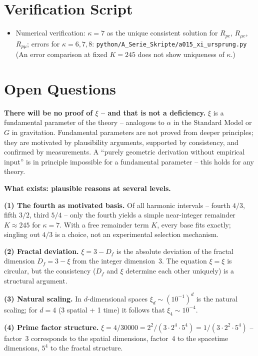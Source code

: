 \section{Verification Script}

\begin{itemize}[leftmargin=2em,itemsep=2pt,topsep=2pt]
  \item Numerical verification: $\kappa=7$ as the unique consistent solution
    for $R_{pe}$, $R_{\mu e}$, $R_{p\mu}$; errors for $\kappa=6,7,8$:
    \texttt{python/A\_Serie\_Skripte/a015\_xi\_ursprung.py}
    (An error comparison at fixed $K=245$ does not show uniqueness of $\kappa$.)
\end{itemize}

\section{Open Questions}

\textbf{There will be no proof of $\xi$ -- and that is not a deficiency.}
$\xi$ is a fundamental parameter of the theory -- analogous to $\alpha$ in
the Standard Model or $G$ in gravitation. Fundamental parameters are not
proved from deeper principles; they are motivated by plausibility arguments,
supported by consistency, and confirmed by measurements. A ``purely geometric
derivation without empirical input'' is in principle impossible for a
fundamental parameter -- this holds for any theory.

\textbf{What exists: plausible reasons at several levels.}

\textbf{(1) The fourth as motivated basis.} Of all harmonic
intervals -- fourth $4/3$, fifth $3/2$, third $5/4$ -- only the fourth
yields a simple near-integer remainder $K \approx 245$ for $\kappa=7$.
With a free remainder term $K$, every base fits exactly; singling out $4/3$
is a choice, not an experimental selection mechanism.

\textbf{(2) Fractal deviation.} $\xi=3-D_f$ is the absolute deviation
of the fractal dimension $D_f=3-\xi$ from the integer dimension~3.
The equation $\xi=\xi$ is circular, but the consistency ($D_f$ and $\xi$
determine each other uniquely) is a structural argument.

\textbf{(3) Natural scaling.} In $d$-dimensional spaces $\xi_d\sim(10^{-1})^d$
is the natural scaling; for $d=4$ (3 spatial + 1 time) it follows that
$\xi_4\sim10^{-4}$.

\textbf{(4) Prime factor structure.} $\xi=4/30000=2^2/(3\cdot2^4\cdot5^4)
=1/(3\cdot2^2\cdot5^4)$ -- factor~3 corresponds to the spatial dimensions,
factor~4 to the spacetime dimensions, $5^4$ to the fractal structure.

